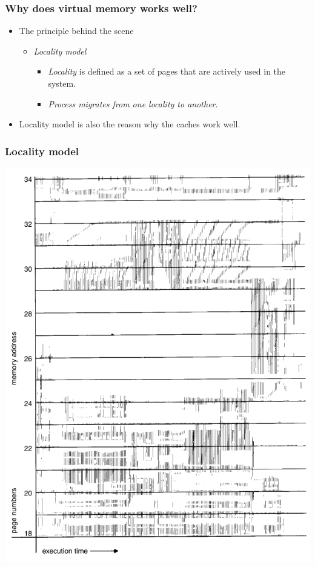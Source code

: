 \documentclass[CJKutf8,xcolor=pdftex,dvipsnames,table]{beamer}
\begin{document}
\begin{CJK*}{UTF8}{song}
  \begin{frame}
    \frametitle{Why does virtual memory works well?} \pause
    \begin{itemize}
    \item{The principle behind the scene} \pause
      \begin{itemize}
      \item{\emph{Locality model}} \pause
        \begin{itemize}
        \item{\emph{Locality} is defined as a set of pages that are actively used in the system.} \pause
        \item{\emph{Process migrates from one locality to another}.} \pause
        \end{itemize}
      \end{itemize}
    \item{Locality model is also the reason why the caches work well.}
    \end{itemize}
  \end{frame}
  
  \begin{frame}
    \frametitle{Locality model} \pause
    \begin{center}
      \includegraphics[scale=.3]{v6f10-16}
    \end{center}
  \end{frame}
  

\end{CJK*}
\end{document}
